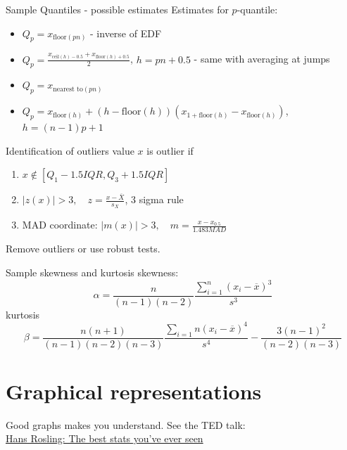 \documentclass[smaller, hyperref={colorlinks=true}]{beamer}
\def\abs#1{\lvert#1\rvert}
\def\df#1{{\usebeamercolor[fg]{my orange} #1}}
\def\xskip{{\vspace{2ex}}}
\begin{document}
\begin{frame}{Sample Quantiles - possible estimates}
Estimates for $p$-quantile: 
\begin{itemize}
 \item $Q_p = x_{\text{floor}(pn)}$	- inverse of EDF
 \item $Q_p = \frac{x_{\text{ceil}(h)-0.5} + x_{\text{floor}(h)+0.5}}{2}$, $h=pn+0.5$ - same with averaging at jumps
 \item $Q_p = x_{\text{nearest to}(pn)}$ 
 \item $Q_p = x_{\text{floor}(h)} + (h - \text{floor}(h))(x_{1+\text{floor}(h) } - x_{\text{floor}(h)} ) $, $h=(n-1)p+1$ 
\end{itemize} 
\end{frame}


\begin{frame}{Identification of outliers}
value $x$ is outlier if
\begin{enumerate}
\item $x \notin [ Q_1 - 1.5 IQR, Q_3 + 1.5 IQR]$
\item $\abs{z(x)} > 3,\quad z = \frac{x - \overline{X}}{s_X}$, 3 sigma rule
\item MAD coordinate: $\abs{m(x)} > 3, \quad m = \frac{x - x_{0.5}}{1.483 MAD}$
\end{enumerate}

\xskip
Remove outliers or use robust tests.
\end{frame}

\begin{frame}{Sample skewness and kurtosis}
\df{skewness}:
\[
\alpha = \frac{n}{(n-1)(n-2)}\frac{\sum_{i=1}^{n} (x_i - \overline{x})^3}{s^3}
\]
\df{kurtosis}
\[
\beta = \frac{n(n+1)}{(n-1)(n-2)(n-3)}\frac{\sum_{i=1}{n} (x_i-\overline{x})^4}{s^4} - \frac{3(n-1)^2}{(n-2)(n-3)}
\]
\end{frame}


\section{Graphical representations}

\begin{frame}{Good graphs makes you understand.}
 See the TED talk:\\
 \href{http://www.ted.com/talks/hans_rosling_shows_the_best_stats_you_ve_ever_seen?language=en}{Hans Rosling: The best stats you've ever seen}
\end{frame}
\end{document}
